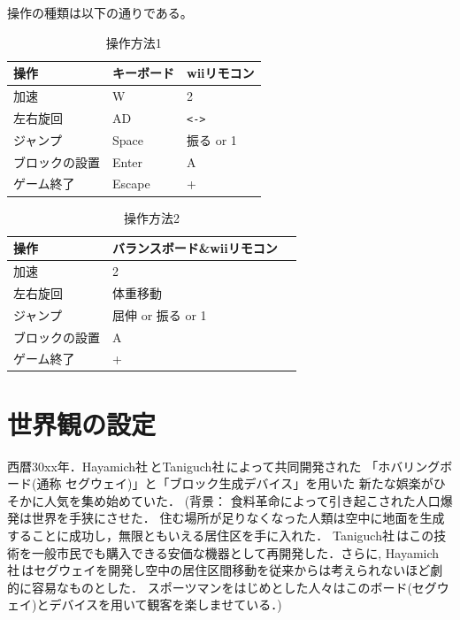\documentclass{jarticle}
\begin{document}
操作の種類は以下の通りである。
\begin{table}[H]
    \caption{操作方法1}
    \label{table:control1}
    \begin{center}
    \begin{tabular}{|l|l|l|}\hline
    操作 & キーボード & wiiリモコン\\ \hline
    加速 & W & 2 \\ \hline
    左右旋回 & AD & \verb+<->+ \\ \hline
    ジャンプ & Space & 振る or 1 \\ \hline
    ブロックの設置 & Enter & A \\ \hline
    ゲーム終了 & Escape& + \\\hline
    
    \end{tabular}
    \end{center}
\end{table}

\begin{table}[H]
    \caption{操作方法2}
    \label{table:control2}
    \begin{center}
    \begin{tabular}{|l|l|l|}\hline
    操作 & バランスボード\&wiiリモコン\\ \hline
    加速 & 2 \\ \hline
    左右旋回 & 体重移動 \\ \hline
    ジャンプ & 屈伸 or 振る or 1 \\ \hline
    ブロックの設置 & A \\ \hline
    ゲーム終了 & + \\\hline
    \end{tabular}
    \end{center}
\end{table}

\section{世界観の設定}
\begin{shadebox}
\label{世界観の設定}
西暦30xx年．Hayamich社\,とTaniguch社\,によって共同開発された
「ホバリングボード(通称 セグウェイ)」と「ブロック生成デバイス」を用いた
新たな娯楽がひそかに人気を集め始めていた．
(背景：
食料革命によって引き起こされた人口爆発は世界を手狭にさせた．
住む場所が足りなくなった人類は空中に地面を生成することに成功し，無限ともいえる居住区を手に入れた．
Taniguch社\,はこの技術を一般市民でも購入できる安価な機器として再開発した．さらに, Hayamich社\,はセグウェイを開発し空中の居住区間移動を従来からは考えられないほど劇的に容易なものとした．
スポーツマンをはじめとした人々はこのボード(セグウェイ)とデバイスを用いて観客を楽しませている．)
\end{shadebox}
\end{document}
